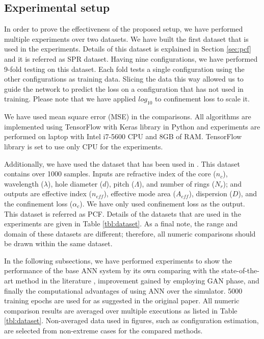 \documentclass[10pt]{IEEEtran}
\begin{document}
\subsection{Experimental setup}

\def\dszero{PCF}

In order to prove the effectiveness of the proposed setup, we have performed multiple experiments over two datasets. We have built the first dataset that is used in the experiments. Details of this dataset is explained in Section \ref{sec:pcf} and it is referred as SPR dataset. Having nine configurations, we have performed 9-fold testing on this dataset. Each fold tests a single configuration using the other configurations as training data. Slicing the data this way allowed us to guide the network to predict the loss on a configuration that has not used in training. Please note that we have applied $log_{10}$ to confinement loss to scale it.

We have used mean square error (MSE) in the comparisons. All algorithms are implemented using TensorFlow with Keras library in Python and experiments are performed on laptop with Intel i7-5600 CPU and 8GB of RAM. TensorFlow library is set to use only CPU for the experiments.

Additionally, we have used the dataset that has been used in \cite{paper0}. This dataset contains over 1000 samples. Inputs are refractive index of the core ($n_c$), wavelength ($\lambda$), hole diameter ($d$), pitch ($\Lambda$), and number of rings ($N_r$);  and outputs are effective index ($n_{eff}$), effective mode area ($A_{eff}$), dispersion ($D$), and the confinement loss ($\alpha_c$). We have only used confinement loss as the output. This dataset is referred as \dszero. Details of the datasets that are used in the experiments are given in Table \ref{tbl:dataset}. As a final note, the range and domain of these datasets are different; therefore, all numeric comparisons should be drawn within the same dataset.

In the following subsections, we have performed experiments to show the performance of the base ANN system by its own comparing with the state-of-the-art method in the literature \cite{paper0}, improvement gained by employing GAN phase, and finally the computational advantages of using ANN over the simulator. 5000 training epochs are used for \cite{paper0} as suggested in the original paper. All numeric comparison results are averaged over multiple executions as listed in Table \ref{tbl:dataset}. Non-averaged data used in figures, such as configuration estimation, are selected from non-extreme cases for the compared methods.
\end{document}
